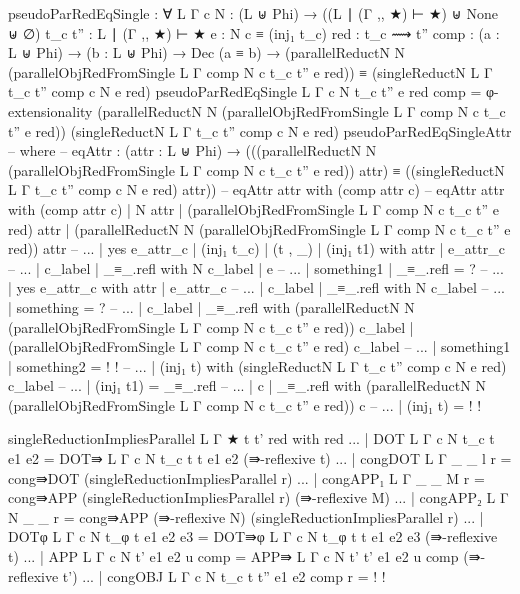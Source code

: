 {\begin{code}
  pseudoParRedEqSingle : ∀ {L Γ c} {N : (L ⊎ Phi) → ((L ∣ (Γ ,, ★) ⊢ ★) ⊎ None ⊎ ∅)} {t_c t'' : L ∣ (Γ ,, ★) ⊢ ★} {e : N c ≡ (inj₁ t_c)} {red : t_c ⟿ t''} {comp : (a : L ⊎ Phi) → (b : L ⊎ Phi) → Dec (a ≡ b)} → (parallelReductN N (parallelObjRedFromSingle {L} {Γ} {comp} N c t_c t'' e red)) ≡ (singleReductN {L} {Γ} {t_c} {t''} {comp} c N e red)
  pseudoParRedEqSingle {L} {Γ} {c} {N} {t_c} {t''} {e} {red} {comp} = φ-extensionality (parallelReductN N (parallelObjRedFromSingle {L} {Γ} {comp} N c t_c t'' e red)) (singleReductN {L} {Γ} {t_c} {t''} {comp} c N e red) pseudoParRedEqSingleAttr -- where
    -- eqAttr : (attr : L ⊎ Phi) → (((parallelReductN N (parallelObjRedFromSingle {L} {Γ} {comp} N c t_c t'' e red)) attr) ≡ ((singleReductN {L} {Γ} {t_c} {t''} {comp} c N e red) attr))
    -- eqAttr attr with (comp attr c)
    -- eqAttr attr with (comp attr c) | N attr | (parallelObjRedFromSingle {L} {Γ} {comp} N c t_c t'' e red) attr | (parallelReductN N (parallelObjRedFromSingle {L} {Γ} {comp} N c t_c t'' e red)) attr
    -- ... | yes e_attr_c | (inj₁ t_c) | (t , _) | (inj₁ t1) with attr | e_attr_c
    -- ...   | c_label | _≡_.refl with N c_label | e
    -- ...     | something1 | _≡_.refl = ?
    -- ... | yes e_attr_c with attr | e_attr_c
    -- ...   | c_label | _≡_.refl with N c_label
    -- ...     | something = ?
    -- ...   | c_label | _≡_.refl with (parallelReductN N (parallelObjRedFromSingle {L} {Γ} {comp} N c t_c t'' e red)) c_label | (parallelObjRedFromSingle {L} {Γ} {comp} N c t_c t'' e red) c_label
    -- ...     | something1 | something2 = {!   !}
    -- ...     | (inj₁ t) with (singleReductN {L} {Γ} {t_c} {t''} {comp} c N e red) c_label
    -- ...       | (inj₁ t1) = _≡_.refl
    -- ...   | c | _≡_.refl with (parallelReductN N (parallelObjRedFromSingle {L} {Γ} {comp} N c t_c t'' e red)) c
    -- ...     | (inj₁ t) = {!   !}

  singleReductionImpliesParallel {L} {Γ} {★} {t} {t'} red with red
  ... | DOT {L} {Γ} {c} {N} {t_c} {t} {e1} {e2} = DOT⇛ {L} {Γ} {c} {N} {t_c} {t} {t} {e1} {e2} (⇛-reflexive t)
  ... | congDOT {L} {Γ} {_} {_} {l} r = cong⇛DOT (singleReductionImpliesParallel r)
  ... | congAPP₁ {L} {Γ} {_} {_} {M} r = cong⇛APP (singleReductionImpliesParallel r) (⇛-reflexive M)
  ... | congAPP₂ {L} {Γ} {N} {_} {_} r = cong⇛APP (⇛-reflexive N) (singleReductionImpliesParallel r)
  ... | DOTφ {L} {Γ} {c} {N} {t_φ} {t} {e1} {e2} {e3} = DOT⇛φ {L} {Γ} {c} {N} {t_φ} {t} {t} {e1} {e2} {e3} (⇛-reflexive t)
  ... | APP {L} {Γ} {c} {N} {t'} {e1} {e2} {u} comp = APP⇛ {L} {Γ} {c} {N} {t'} {t'} {e1} {e2} {u} {comp} (⇛-reflexive t')
  ... | congOBJ {L} {Γ} {c} {N} {t_c} {t} {t''} {e1} {e2} {comp} r = {!   !}


\end{code}}
